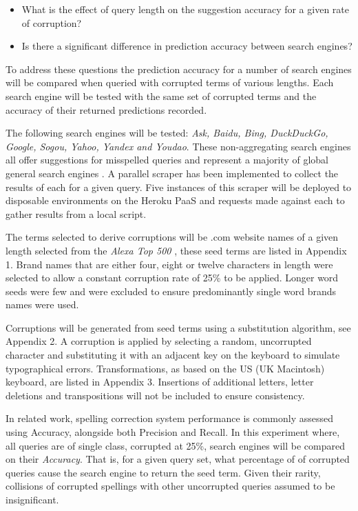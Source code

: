 \documentclass{csfourzero}
\begin{document}
\begin{itemize}
  \item{What is the effect of query length on the suggestion accuracy for a given rate of corruption?}
  \item{Is there a significant difference in prediction accuracy between search engines?}
\end{itemize}

To address these questions the prediction accuracy for a number of search engines will be compared when queried with corrupted terms of various lengths. Each search engine will be tested with the same set of corrupted terms and the accuracy of their returned predictions recorded.

The following search engines will be tested: \textit{Ask, Baidu, Bing, DuckDuckGo, Google, Sogou, Yahoo, Yandex and Youdao}. These non-aggregating search engines all offer suggestions for misspelled queries and represent a majority of global general search engines \cite{searchenginewiki}. A parallel scraper \cite{scraper} has been implemented to collect the results of each for a given query. Five instances of this scraper will be deployed to disposable environments on the Heroku PaaS and requests made against each to gather results from a local script.

The terms selected to derive corruptions will be .com website names of a given length selected from the \textit{Alexa Top 500} \cite{alexatop500}, these seed terms are listed in Appendix 1. Brand names that are either four, eight or twelve characters in length were selected to allow a constant corruption rate of 25\% to be applied. Longer word seeds were few and were excluded to ensure predominantly single word brands names were used.

Corruptions will be generated from seed terms using a substitution algorithm, see Appendix 2. A corruption is applied by selecting a random, uncorrupted character and substituting it with an adjacent key on the keyboard to simulate typographical errors. Transformations, as based on the US (UK Macintosh) keyboard, are listed in Appendix 3. Insertions of additional letters, letter deletions and transpositions will not be included to ensure consistency.

In related work, spelling correction system performance is commonly assessed using Accuracy, alongside both Precision and Recall. In this experiment where, all queries are of single class, corrupted at 25\%, search engines will be compared on their \textit{Accuracy}. That is, for a given query set, what percentage of of corrupted queries cause the search engine to return the seed term. Given their rarity, collisions of corrupted spellings with other uncorrupted queries assumed to be insignificant.
\end{document}
